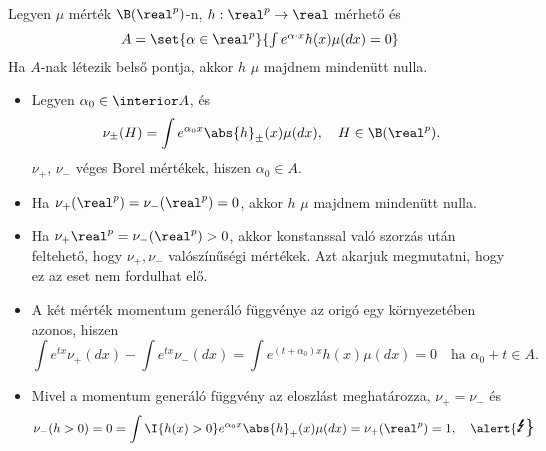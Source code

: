 \documentclass[aspectratio=169,notheorems,9pt,\option]{beamer}
\begin{document}
\begin{frame}%
  \begin{theorem}
    Legyen $\mu$ mérték $\B (\real^p)$-n, $h:\real^p\to\real$ mérhető és 
    \begin{displaymath}\textstyle
      A=\set{\alpha\in\real^p}{\int e^{\alpha \cdot x}h (x)\mu
        (dx)=0}%
    \end{displaymath}
    Ha $A$-nak létezik belső pontja, akkor $h$ $\mu$ majdnem mindenütt nulla.
  \end{theorem}
  \begin{itemize}
  \item Legyen $\alpha_0\in\interior A$, és
    \begin{displaymath}
      \nu_{\pm} (H)=\int e^{\alpha_0x}\abs{h}_\pm (x) \mu (d x),\quad H\in\B(\real^p).
    \end{displaymath}
    $\nu_{+}$, $\nu_{-}$ véges Borel mértékek,  hiszen $\alpha_0\in A$.
  \item  Ha $\nu_{+} (\real^p)=\nu_{-} (\real^p) = 0$, akkor $h$ $\mu$ majdnem mindenütt
    nulla.
  \item Ha $\nu_{+}{\real^p}=\nu_{-} (\real^p)>0$, akkor konstanssal
    való szorzás után feltehető, hogy $\nu_{+},\nu_{-}$ valószínűségi
    mértékek. Azt akarjuk megmutatni, hogy ez az eset nem fordulhat
    elő. 
    
  \item A két mérték momentum generáló függvénye az origó egy
    környezetében azonos, hiszen
    \begin{displaymath}
      \int e^{t x}\nu_{+} (d x)-\int e^{t x}\nu_{-} (d x)=\int
      e^{(t+\alpha_0)x}h (x)\mu (d x)=0
          \quad\text{ha $\alpha_0+t\in A$.}
    \end{displaymath}
  \item Mivel a momentum generáló függvény az eloszlást meghatározza,
    $\nu_{+}=\nu_{-}$ és %
    \begin{displaymath}
      \nu_{-} (h>0)=0=
      \int \I{h (x) >0} e^{\alpha_0 x}\abs{h}_+ (x)\mu (d x)=
      \nu_{+} (\real^p)=1,
      \quad\text{\alert{\Large\Lightning}}
    \end{displaymath}
  \end{itemize}
\end{frame}
\end{document}
